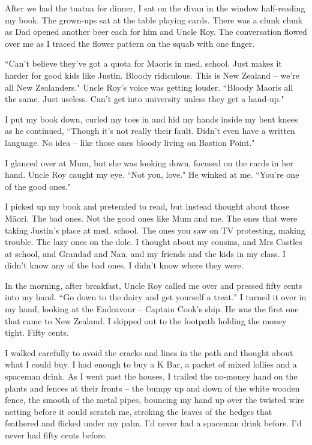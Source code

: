 \documentclass[10pt,a4paper]{article}
\newcommand{\qm}[1]{``#1"}
\begin{document}
After we had the tuatua for dinner, I sat on the divan in the window half-reading my book. The grown-ups sat at the table playing cards. There was a clunk clunk as Dad opened another beer each for him and Uncle Roy. The conversation flowed over me as I traced the flower pattern on the squab with one finger.

\qm{Can't believe they've got a quota for Maoris in med. school. Just makes it harder for good kids like Justin. Bloody ridiculous. This is New Zealand -- we're all New Zealanders.} Uncle Roy's voice was getting louder. \qm{Bloody Maoris all the same. Just useless. Can't get into university unless they get a hand-up.}

I put my book down, curled my toes in and hid my hands inside my bent knees as he continued, \qm{Though it's not really their fault. Didn't even have a written language. No idea -- like those ones bloody living on Bastion Point.}

I glanced over at Mum, but she was looking down, focused on the cards in her hand. Uncle Roy caught my eye. \qm{Not you, love.} He winked at me. \qm{You're one of the good ones.}

I picked up my book and pretended to read, but instead thought about those Māori. The bad ones. Not the good ones like Mum and me. The ones that were taking Justin's place at med. school. The ones you saw on TV protesting, making trouble. The lazy ones on the dole. I thought about my cousins, and Mrs Castles at school, and Grandad and Nan, and my friends and the kids in my class. I didn't know any of the bad ones. I didn't know where they were.

In the morning, after breakfast, Uncle Roy called me over and pressed fifty cents into my hand. \qm{Go down to the dairy and get yourself a treat.} I turned it over in my hand, looking at the Endeavour -- Captain Cook's ship. He was the first one that came to New Zealand. I skipped out to the footpath holding the money tight. Fifty cents.

I walked carefully to avoid the cracks and lines in the path and thought about what I could buy. I had enough to buy a K Bar, a packet of mixed lollies and a spaceman drink. As I went past the houses, I trailed the no-money hand on the plants and fences at their fronts -- the bumpy up and down of the white wooden fence, the smooth of the metal pipes, bouncing my hand up over the twisted wire netting before it could scratch me, stroking the leaves of the hedges that feathered and flicked under my palm. I'd never had a spaceman drink before. I'd never had fifty cents before.
\end{document}
